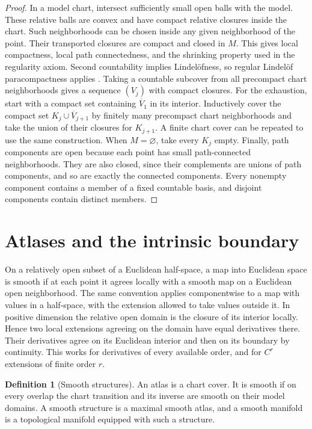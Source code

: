 \documentclass[11pt,oneside,openany]{book}
\theoremstyle{definition}
\newtheorem{definition}[theorem]{Definition}
\theoremstyle{remark}
\begin{document}
\begin{proof}
In a model chart, intersect sufficiently small open balls with the model.
These relative balls are convex and have compact relative closures
inside the chart. Such neighborhoods can be chosen inside any given
neighborhood of the point. Their transported closures are compact and
closed in \(M\). This gives local compactness, local path connectedness,
and the shrinking property used in the regularity axiom. Second
countability implies Lindel\"ofness, so regular Lindel\"of
paracompactness applies \cite{d10}. Taking a countable subcover from all
precompact chart neighborhoods gives a sequence \((V_j)\) with compact
closures. For the exhaustion, start with a compact set containing
\(\overline V_1\) in its interior. Inductively cover the compact set
\(K_j\cup\overline V_{j+1}\) by finitely many precompact chart
neighborhoods and take the union of their closures for \(K_{j+1}\).
A finite chart cover can be repeated to use the same construction.
When \(M=\varnothing\), take every \(K_j\) empty. Finally, path
components are open because each point has small path-connected
neighborhoods. They are also closed, since their complements are
unions of path components, and so are exactly the connected components.
Every nonempty component contains a member of a fixed countable basis,
and disjoint components contain distinct members.
\end{proof}

\section{Atlases and the intrinsic boundary}

On a relatively open subset of a Euclidean half-space, a map into
Euclidean space is smooth if at each point it agrees locally with a
smooth map on a Euclidean open neighborhood. The same convention
applies componentwise to a map with values in a half-space, with the
extension allowed to take values outside it. In positive dimension the
relative open domain is the closure of its interior locally. Hence two
local extensions agreeing on the domain have equal derivatives there.
Their derivatives agree on its Euclidean interior and then on its
boundary by continuity. This works for derivatives of every available
order, and for \(C^r\) extensions of finite order \(r\).

\begin{definition}[Smooth structures]\label{p104:M01.02}
An atlas is a chart cover. It is smooth if on every overlap the chart
transition and its inverse are smooth on their model domains. A smooth
structure is a maximal smooth atlas, and a smooth manifold is a
topological manifold equipped with such a structure.
\end{definition}
\end{document}

